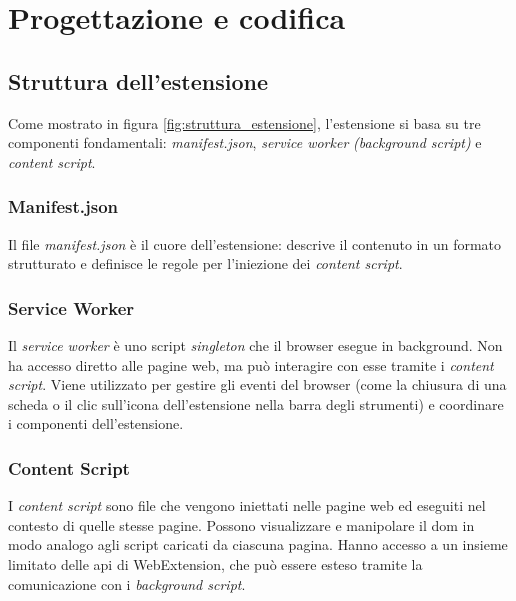 \chapter{Progettazione e codifica}
\label{cap:progettazione-codifica}

\section{Struttura dell'estensione}
\label{sec:struttura-estensione}

\par Come mostrato in figura \ref{fig:struttura_estensione}, l’estensione si basa su tre componenti fondamentali: \textit{manifest.json}, \textit{service worker} \textit{(background script)} e \textit{content script}.

\subsection{Manifest.json}

\par Il file \textit{manifest.json} è il cuore dell’estensione: descrive il contenuto in un formato strutturato e definisce le regole per l'iniezione dei \textit{content script}.

\subsection{Service Worker}

\par Il \textit{service worker} è uno script \textit{singleton} che il browser esegue in background. Non ha accesso diretto alle pagine web, ma può interagire con esse tramite i \textit{content script}. Viene utilizzato per gestire gli eventi del browser (come la chiusura di una scheda o il clic sull’icona dell’estensione nella barra degli strumenti) e coordinare i componenti dell'estensione.

\subsection{Content Script}

\par I \textit{content script} sono file che vengono iniettati nelle pagine web ed eseguiti nel contesto di quelle stesse pagine. Possono visualizzare e manipolare il \gls{dom} in modo analogo agli script caricati da ciascuna pagina. Hanno accesso a un insieme limitato delle \gls{api} di WebExtension, che può essere esteso tramite la comunicazione con i \textit{background script}.

